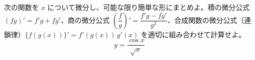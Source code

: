 
次の関数を $x$ について微分し、可能な限り簡単な形にまとめよ。積の微分公式 $(fg)' = f'g + fg'$、商の微分公式 $\left(\dfrac{f}{g}\right)' = \dfrac{f'g - fg'}{g^{2}}$、合成関数の微分公式（連鎖律）$\{f(g(x))\}' = f'(g(x))\,g'(x)$ を適切に組み合わせて計算せよ。
\[
y = \frac{\cos x}{\sqrt{x}}
\]
